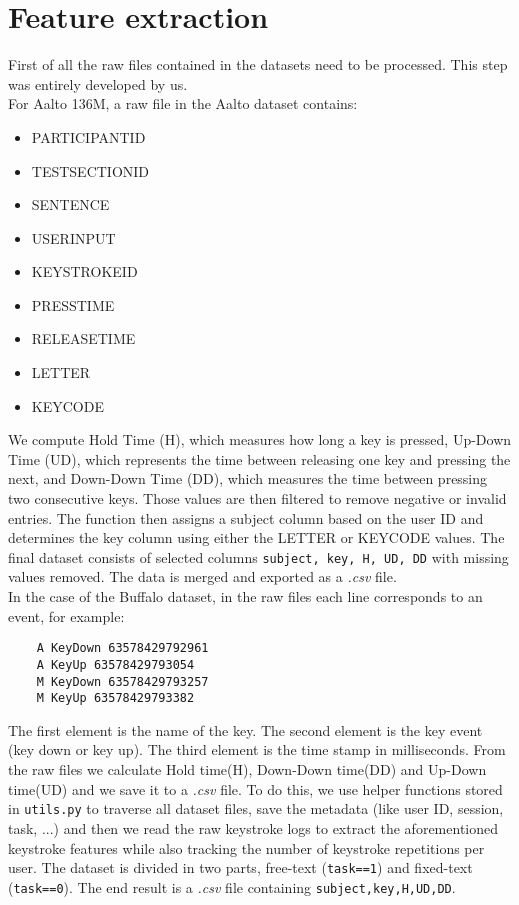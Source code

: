 \section{Feature extraction}

First of all the raw files contained in the datasets need to be processed. This step was entirely developed by us.\\

For Aalto 136M, a raw file in the Aalto dataset contains:
\begin{itemize}
    \item PARTICIPANT\textunderscore ID
    \item TEST\textunderscore SECTION\textunderscore ID
    \item SENTENCE
    \item USER\textunderscore INPUT
    \item KEYSTROKE\textunderscore ID
    \item PRESS\textunderscore TIME
    \item RELEASE\textunderscore TIME
    \item LETTER
    \item KEYCODE
\end{itemize}
We compute Hold Time (H), which measures how long a key is pressed, Up-Down Time (UD), which represents the time between releasing one key and pressing the next, and Down-Down Time (DD), which measures the time between pressing two consecutive keys. Those values are then filtered to remove negative or invalid entries. The function then assigns a subject column based on the user ID and determines the key column using either the LETTER or KEYCODE values. The final dataset consists of selected columns \lstinline|subject, key, H, UD, DD| with missing values removed. The data is merged and exported as a \textit{.csv} file.\\

In the case of the Buffalo dataset, in the raw files each line corresponds to an event, for example:
\begin{verbatim}
    A KeyDown 63578429792961
    A KeyUp 63578429793054
    M KeyDown 63578429793257
    M KeyUp 63578429793382
\end{verbatim}
The first element is the name of the key. The second element is the key event (key down or key up). The third element is the time stamp in milliseconds. From the raw files we calculate Hold time(H), Down-Down time(DD) and Up-Down time(UD) and we save it to a \textit{.csv} file. To do this, we use helper functions stored in \lstinline|utils.py| to traverse all dataset files, save the metadata (like user ID, session, task, ...) and then we read the raw keystroke logs to extract the aforementioned keystroke features while also tracking the number of keystroke repetitions per user. The dataset is divided in two parts, free-text (\lstinline|task==1|) and fixed-text (\lstinline|task==0|). The end result is a \textit{.csv} file containing \lstinline|subject,key,H,UD,DD|.\\

